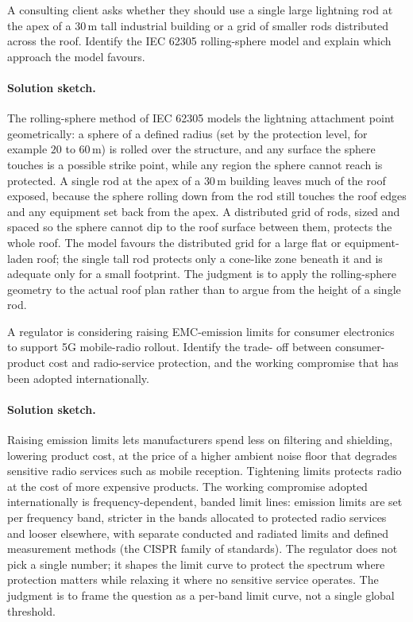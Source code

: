 \begin{exercise}
A consulting client asks whether they should use a single large
lightning rod at the apex of a $30\,\si{\meter}$ tall industrial
building or a grid of smaller rods distributed across the roof.
Identify the IEC 62305 rolling-sphere model and explain which
approach the model favours.

\paragraph{Solution sketch.} The rolling-sphere method of IEC 62305 models
the lightning attachment point geometrically: a sphere of a defined
radius (set by the protection level, for example $20$ to $60\,\si{
\meter}$) is rolled over the structure, and any surface the sphere
touches is a possible strike point, while any region the sphere cannot
reach is protected. A single rod at the apex of a $30\,\si{\meter}$
building leaves much of the roof exposed, because the sphere rolling
down from the rod still touches the roof edges and any equipment set
back from the apex. A distributed grid of rods, sized and spaced so the
sphere cannot dip to the roof surface between them, protects the whole
roof. The model favours the distributed grid for a large flat or
equipment-laden roof; the single tall rod protects only a cone-like zone
beneath it and is adequate only for a small footprint. The judgment is
to apply the rolling-sphere geometry to the actual roof plan rather than
to argue from the height of a single rod.
\end{exercise}

\begin{exercise}
A regulator is considering raising EMC-emission limits for consumer
electronics to support 5G mobile-radio rollout. Identify the trade-
off between consumer-product cost and radio-service protection, and
the working compromise that has been adopted internationally.

\paragraph{Solution sketch.} Raising emission limits lets manufacturers
spend less on filtering and shielding, lowering product cost, at the
price of a higher ambient noise floor that degrades sensitive radio
services such as mobile reception. Tightening limits protects radio at
the cost of more expensive products. The working compromise adopted
internationally is frequency-dependent, banded limit lines: emission
limits are set per frequency band, stricter in the bands allocated to
protected radio services and looser elsewhere, with separate conducted
and radiated limits and defined measurement methods (the CISPR family
of standards). The regulator does not pick a single number; it shapes
the limit curve to protect the spectrum where protection matters while
relaxing it where no sensitive service operates. The judgment is to
frame the question as a per-band limit curve, not a single global
threshold.
\end{exercise}

